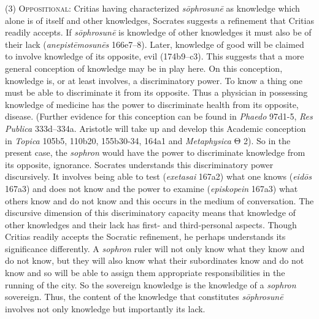 (3) \textsc{Oppositional}: Critias having characterized \emph{sōphrosunē} as knowledge which alone is of itself and other knowledges, Socrates suggests a refinement that Critias readily accepts. If \emph{sōphrosunē} is knowledge of other knowledges it must also be of their lack (\emph{anepistēmosunēs} 166e7–8). Later, knowledge of good will be claimed to involve knowledge of its opposite, evil (174b9–c3). This suggests that a more general conception of knowledge may be in play here. On this conception, knowledge is, or at least involves, a discriminatory power. To know a thing one must be able to discriminate it from its opposite.  Thus a physician in possessing knowledge of medicine has the power to discriminate health from its opposite, disease. (Further evidence for this conception can be found in \emph{Phaedo} 97d1-5, \emph{Res Publica} 333d–334a. Aristotle will take up and develop this Academic conception in \emph{Topica} 105b5, 110b20, 155b30-34, 164a1 and \emph{Metaphysica} {\sbl Θ} 2). So in the present case, the \emph{sophron} would have the power to discriminate knowledge from its opposite, ignorance. Socrates understands this discriminatory power discursively. It involves being able to test (\emph{exetasai} 167a2) what one knows (\emph{eidōs} 167a3) and does not know and the power to examine (\emph{episkopein} 167a3) what others know and do not know and this occurs in the medium of conversation. The discursive dimension of this discriminatory capacity means that knowledge of other knowledges and their lack has first- and third-personal aspects. Though Critias readily accepts the Socratic refinement, he perhaps understands its significance differently. A \emph{sophron} ruler will not only know what they know and do not know, but they will also know what their subordinates know and do not know and so will be able to assign them appropriate responsibilities in the running of the city. So the sovereign knowledge is the knowledge of a \emph{sophron} sovereign. Thus, the content of the knowledge that constitutes \emph{sōphrosunē} involves not only knowledge but importantly its lack. 

